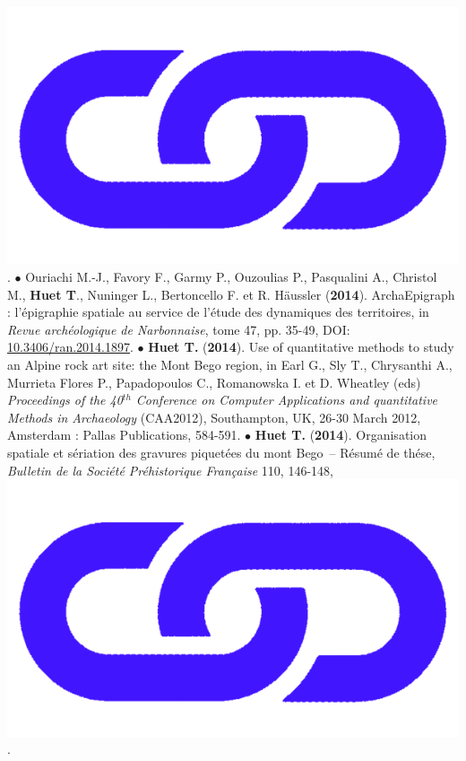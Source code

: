 \documentclass{article}
\begin{document}
\href{https://www.researchgate.net/publication/347437308_Methodes_informatiques_pour_l'etude_des_gravures_rupestres_les_exemples_du_Valcamonica_Italie_et_du_mont_Bego_France}{\includegraphics[scale=0.015]{link_darkblue.png}}.
\smallbreak
$\bullet$ Ouriachi M.-J., Favory F., Garmy P., Ouzoulias P., Pasqualini A., Christol M., \textbf{Huet T}., Nuninger L., Bertoncello F. et R. H\"{a}ussler (\textbf{2014}). ArchaEpigraph : l'\'{e}pigraphie spatiale au service de l'\'{e}tude des dynamiques des territoires, in \textit{Revue arch\'{e}ologique de Narbonnaise}, tome 47, pp. 35-49, DOI: \href{https://doi.org/10.3406/ran.2014.1897}{10.3406/ran.2014.1897}.
\smallbreak
$\bullet$ \textbf{Huet T.} (\textbf{2014}). Use of quantitative methods to study an Alpine rock art site: the Mont Bego region, in Earl G., Sly T., Chrysanthi A., Murrieta Flores P., Papadopoulos C., Romanowska I. et D. Wheatley (eds) \textit{Proceedings of the 40${}^{th}$ Conference on Computer Applications and quantitative Methods in Archaeology} (CAA2012), Southampton, UK, 26-30 March 2012, Amsterdam : Pallas Publications, 584-591.
\smallbreak
$\bullet$ \textbf{Huet T.} (\textbf{2014}). Organisation spatiale et s\'{e}riation des gravures piquet\'{e}es du mont Bego~-- R\'{e}sum\'{e} de th\'{e}se, \textit{Bulletin de la Soci\'{e}t\'{e} Pr\'{e}historique Fran\c{c}aise} 110, 146-148, \href{https://www.persee.fr/doc/bspf_0249-7638_2013_num_110_1_14242}{\includegraphics[scale=0.015]{link_darkblue.png}}.
\end{document}
